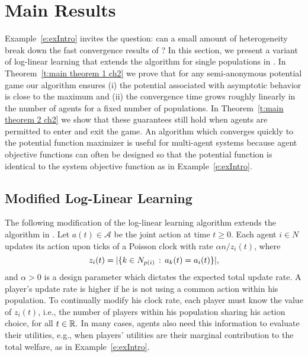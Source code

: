 \section{Main Results}

Example~\ref{e:exIntro} invites the question: can a small amount of heterogeneity break down the fast convergence results of \cite{Shah2010}? In this section, we present a variant of log-linear learning \cite{Blume1993} that extends the algorithm for single populations in \cite{Shah2010}.  In Theorem~\ref{t:main theorem 1 ch2} we prove that for any semi-anonymous potential game our algorithm ensures (i) the potential associated with asymptotic behavior is close to the maximum and (ii) the convergence time grows roughly linearly in the number of agents for a fixed number of populations.  In Theorem~\ref{t:main theorem 2 ch2} we show that these guarantees still hold when agents are permitted to enter and exit the game.  An algorithm which converges quickly to the potential function maximizer is useful for multi-agent systems because agent objective functions can often be designed so that the potential function is identical to the system objective function as in Example~\ref{e:exIntro}.

\subsection{Modified Log-Linear Learning}\label{s:alg description}
The following modification of the log-linear learning algorithm extends the algorithm in \cite{Shah2010}.
Let $a(t)\in\mathcal{A}$ be the joint action at time $t \geq 0$.  Each agent $i \in N$ updates its action upon ticks of a Poisson clock with rate $\alpha n/z_i(t)$, where 
%
$$z_i(t) = |\{k\in N_{p(i)} \,:\, a_k(t) = a_i(t)\}|,$$
%
and $\alpha > 0$ is a design parameter which dictates the expected total update rate.  
A player's update rate is higher if he is not using a common action within his population. To continually modify his clock rate, each player must know the value of $z_i(t)$, i.e., the number of players within his population sharing his action choice, for all $t\in \mathbb{R}.$  In many cases, agents also need this information to evaluate their utilities, e.g., when players' utilities are their marginal contribution to the total welfare, as in Example~\ref{e:exIntro}. 
   
